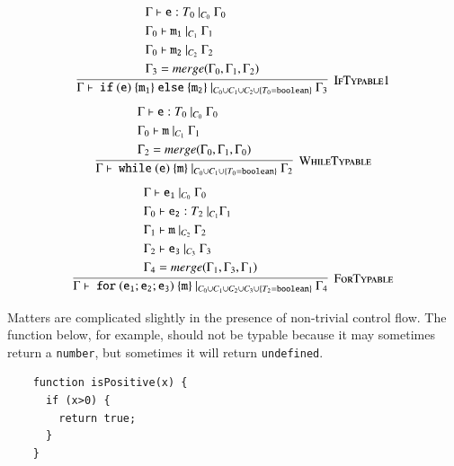 \documentclass[12pt,a4paper,twoside,openright]{report}
\theoremstyle{definition}
\theoremstyle{dotless}
\begin{document}
$$\infer[\textsc{IfTypable1}]{
  \Gamma\vdash\ \mathtt{if\ (e)\ \{m_1\}\ else\ \{m_2\}}\ |_{C_0\cup C_1\cup C_2\cup\{T_0=\mathtt{boolean}\}}\ \Gamma_3
}{
  \begin{split}
	&\Gamma\vdash \mathtt{e}:T_0\ |_{C_0}\ \Gamma_0 \\
	&\Gamma_0\vdash \mathtt{m_1}\ |_{C_1}\ \Gamma_1 \\
	&\Gamma_0\vdash \mathtt{m_2}\ |_{C_2}\ \Gamma_2 \\
	&\Gamma_3 = merge(\Gamma_0, \Gamma_1, \Gamma_2)
  \end{split}
}$$
$$\infer[\textsc{WhileTypable}]{
  \Gamma\vdash\ \mathtt{while\ (e)\ \{m\}}\ |_{C_0\cup C_1\cup \{T_0=\mathtt{boolean}\}}\ \Gamma_2
}{
  \begin{split}
	&\Gamma\vdash \mathtt{e}:T_0\ |_{C_0}\ \Gamma_0 \\
	&\Gamma_0\vdash \mathtt{m}\ |_{C_1}\ \Gamma_1 \\
	&\Gamma_2 = merge(\Gamma_0, \Gamma_1, \Gamma_0)
  \end{split}
}$$
$$\infer[\textsc{ForTypable}]{
  \Gamma\vdash\ \mathtt{for\ (e_1; e_2; e_3)\ \{m\}}\ |_{C_0\cup C_1\cup C_2\cup C_3\cup \{T_2=\mathtt{boolean}\}}\ \Gamma_4
}{
  \begin{split}
	&\Gamma\vdash \mathtt{e_1}\ |_{C_0}\ \Gamma_0 \\
	&\Gamma_0\vdash \mathtt{e_2} : T_2\ |_{C_1} \Gamma_1 \\
	&\Gamma_1\vdash \mathtt{m}\ |_{C_2}\ \Gamma_2 \\
	&\Gamma_2\vdash \mathtt{e_3}\ |_{C_3}\ \Gamma_3 \\
	&\Gamma_4 = merge(\Gamma_1, \Gamma_3, \Gamma_1)
  \end{split}
}$$

Matters are complicated slightly in the presence of non-trivial control flow.
The function below, for example, should not be typable because it may sometimes return
a \texttt{number}, but sometimes it will return \texttt{undefined}.
\begin{program}[H]
  \begin{verbatim}
	function isPositive(x) {
	  if (x>0) {
		return true;
	  }
	}
  \end{verbatim}
\end{program}
\end{document}
